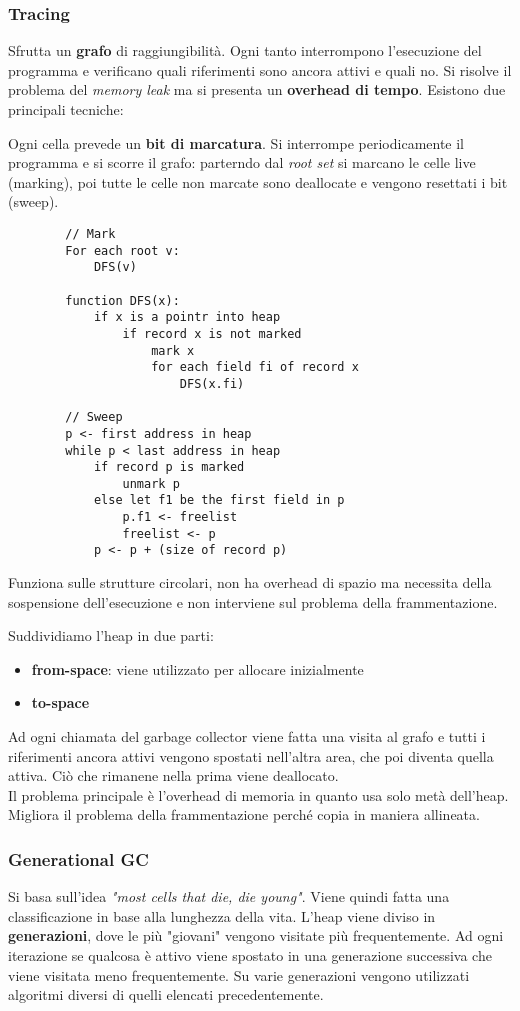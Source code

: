 \subsubsection{Tracing}
Sfrutta un \textbf{grafo} di raggiungibilità. Ogni tanto interrompono l'esecuzione del programma e verificano quali riferimenti sono ancora attivi e quali no. Si risolve il problema del \textit{memory leak} ma si presenta un \textbf{overhead di tempo}. Esistono due principali tecniche:
\begin{definition}
	Ogni cella prevede un \textbf{bit di marcatura}. Si interrompe periodicamente il programma e si scorre il grafo: parterndo dal \textit{root set} si marcano le celle live (marking), poi tutte le celle non marcate sono deallocate e vengono resettati i bit (sweep).
	\begin{lstlisting}
		// Mark
		For each root v:
			DFS(v)
		
		function DFS(x):
			if x is a pointr into heap
				if record x is not marked
					mark x
					for each field fi of record x
						DFS(x.fi)
		
		// Sweep
		p <- first address in heap
		while p < last address in heap
			if record p is marked
				unmark p
			else let f1 be the first field in p
				p.f1 <- freelist
				freelist <- p
			p <- p + (size of record p)
	\end{lstlisting}
	Funziona sulle strutture circolari, non ha overhead di spazio ma necessita della sospensione dell'esecuzione e non interviene sul problema della frammentazione.
\end{definition}
\begin{definition}
	Suddividiamo l'heap in due parti:
	\begin{itemize}
		\item \textbf{from-space}: viene utilizzato per allocare inizialmente
		\item \textbf{to-space}
	\end{itemize}
	Ad ogni chiamata del garbage collector viene fatta una visita al grafo e tutti i riferimenti ancora attivi vengono spostati nell'altra area, che poi diventa quella attiva. Ciò che rimanene nella prima viene deallocato.\\
	Il problema principale è l'overhead di memoria in quanto usa solo metà dell'heap. Migliora il problema della frammentazione perché copia in maniera allineata.
\end{definition}
\subsubsection{Generational GC}
Si basa sull'idea \textit{"most cells that die, die young"}. Viene quindi fatta una classificazione in base alla lunghezza della vita. L'heap viene diviso in \textbf{generazioni}, dove le più "giovani" vengono visitate più frequentemente. Ad ogni iterazione se qualcosa è attivo viene spostato in una generazione successiva che viene visitata meno frequentemente. Su varie generazioni vengono utilizzati algoritmi diversi di quelli elencati precedentemente.